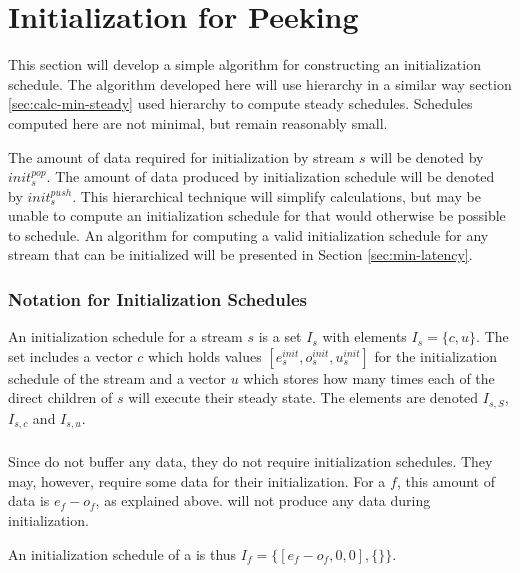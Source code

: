\section{Initialization for Peeking}

This section will develop a simple algorithm for constructing an
initialization schedule.  The algorithm developed here will use
hierarchy in a similar way section \ref{sec:calc-min-steady} used
hierarchy to compute steady schedules.  Schedules computed here
are not minimal, but remain reasonably small.

The amount of data required for initialization by stream $s$ will
be denoted by $init^{pop}_s$. The amount of data produced by
initialization schedule will be denoted by $init^{push}_{s}$. This
hierarchical technique will simplify calculations, but may be
unable to compute an initialization schedule for {\feedbackloops}
that would otherwise be possible to schedule.  An algorithm for
computing a valid initialization schedule for any stream that can
be initialized will be presented in Section \ref{sec:min-latency}.

\subsubsection{Notation for Initialization Schedules}

An initialization schedule for a stream $s$ is a set $I_s$ with
elements $I_s = \{c, u\}$.  The set includes a vector $c$ which
holds values $[e_s^{init}, o_s^{init}, u_s^{init}]$ for the
initialization schedule of the stream and a vector $u$ which
stores how many times each of the direct children of $s$ will
execute their steady state.  The elements are denoted $I_{s,S}$,
$I_{s,c}$ and $I_{s,u}$.

\subsubsection{\filter}

Since {\filters} do not buffer any data, they do not require
initialization schedules.  They may, however, require some data
for their initialization.  For a {\filter} $f$, this amount of data
is $e_f - o_f$, as explained above.  {\filters} will not produce any
data during initialization.

An initialization schedule of a {\filter} is thus $I_f = \{[e_f-o_f,
0, 0], \{\}\}$.

\subsubsection{\pipeline}

